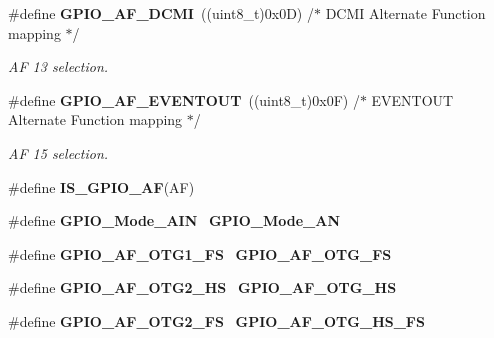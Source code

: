 \begin{DoxyCompactItemize}
\item 
\#define \textbf{ G\+P\+I\+O\+\_\+\+A\+F\+\_\+\+D\+C\+MI}~((uint8\+\_\+t)0x0\+D)  /$\ast$ D\+C\+M\+I Alternate Function mapping $\ast$/
\begin{DoxyCompactList}\small\item\em AF 13 selection. \end{DoxyCompactList}\item 
\#define \textbf{ G\+P\+I\+O\+\_\+\+A\+F\+\_\+\+E\+V\+E\+N\+T\+O\+UT}~((uint8\+\_\+t)0x0\+F)  /$\ast$ E\+V\+E\+N\+T\+O\+U\+T Alternate Function mapping $\ast$/
\begin{DoxyCompactList}\small\item\em AF 15 selection. \end{DoxyCompactList}\item 
\#define \textbf{ I\+S\+\_\+\+G\+P\+I\+O\+\_\+\+AF}(AF)
\item 
\#define \textbf{ G\+P\+I\+O\+\_\+\+Mode\+\_\+\+A\+IN}~\textbf{ G\+P\+I\+O\+\_\+\+Mode\+\_\+\+AN}
\item 
\#define \textbf{ G\+P\+I\+O\+\_\+\+A\+F\+\_\+\+O\+T\+G1\+\_\+\+FS}~\textbf{ G\+P\+I\+O\+\_\+\+A\+F\+\_\+\+O\+T\+G\+\_\+\+FS}
\item 
\#define \textbf{ G\+P\+I\+O\+\_\+\+A\+F\+\_\+\+O\+T\+G2\+\_\+\+HS}~\textbf{ G\+P\+I\+O\+\_\+\+A\+F\+\_\+\+O\+T\+G\+\_\+\+HS}
\item 
\#define \textbf{ G\+P\+I\+O\+\_\+\+A\+F\+\_\+\+O\+T\+G2\+\_\+\+FS}~\textbf{ G\+P\+I\+O\+\_\+\+A\+F\+\_\+\+O\+T\+G\+\_\+\+H\+S\+\_\+\+FS}
\end{DoxyCompactItemize}
